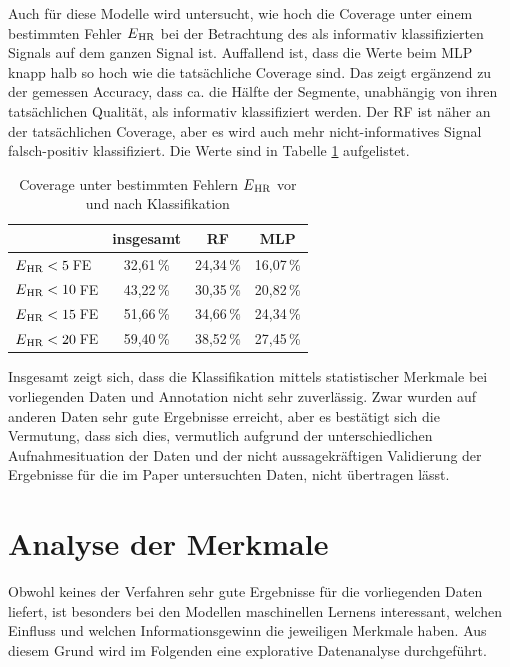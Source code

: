  Auch für diese Modelle wird untersucht, wie hoch die Coverage unter einem bestimmten Fehler $E\textsubscript{HR}$ bei der Betrachtung des als informativ klassifizierten Signals auf dem ganzen Signal ist. Auffallend ist, dass die Werte beim \ac{MLP} knapp halb so hoch wie die tatsächliche Coverage sind. Das zeigt ergänzend zu der gemessen Accuracy, dass ca. die Hälfte der Segmente, unabhängig von ihren tatsächlichen Qualität, als informativ klassifiziert werden. Der \ac{RF} ist näher an der tatsächlichen Coverage, aber es wird auch mehr nicht-informatives Signal falsch-positiv klassifiziert. Die Werte sind in Tabelle \ref{fig:ml-statistical-coverage} aufgelistet.
 
  \begin{table}[H]
 	\centering
  	\begin{tabular}{l || c | c | c}
 											& insgesamt 		& RF			& MLP\\\hline
 		$E\textsubscript{HR} < 5$\,\si{FE} 	&  32{,}61\,\% 	& 24,34\,\%	& 16,07\,\%	\\
 		$E\textsubscript{HR} < 10$\,\si{FE} 	&  43{,}22\,\% 	& 30,35\,\% 	& 20,82\,\%	\\
 		$E\textsubscript{HR} < 15$\,\si{FE} 	&  51{,}66\,\% 	& 34,66\,\% 	& 24,34\,\%	\\
 		$E\textsubscript{HR} < 20$\,\si{FE} 	&  59{,}40\,\% 	& 38,52\,\% 	& 27,45\,\%\\
 	\end{tabular}
 	\caption[Coverage unter bestimmten Fehlern $E\textsubscript{HR}$ vor und nach Klassifikation]{Coverage unter bestimmten Fehlern $E\textsubscript{HR}$ vor und nach Klassifikation}
 	\label{fig:ml-statistical-coverage}
 \end{table}
 
 Insgesamt zeigt sich, dass die Klassifikation mittels statistischer Merkmale bei vorliegenden Daten und Annotation nicht sehr zuverlässig. Zwar wurden auf anderen Daten sehr gute Ergebnisse erreicht, aber es bestätigt sich die Vermutung, dass sich dies, vermutlich aufgrund der unterschiedlichen Aufnahmesituation der Daten und der nicht aussagekräftigen Validierung der Ergebnisse für die im Paper untersuchten Daten, nicht übertragen lässt. 
 
\section{Analyse der Merkmale}

Obwohl keines der Verfahren sehr gute Ergebnisse für die vorliegenden Daten liefert, ist besonders bei den Modellen maschinellen Lernens interessant, welchen Einfluss und welchen Informationsgewinn die jeweiligen Merkmale haben. Aus diesem Grund wird im Folgenden eine explorative Datenanalyse durchgeführt.

